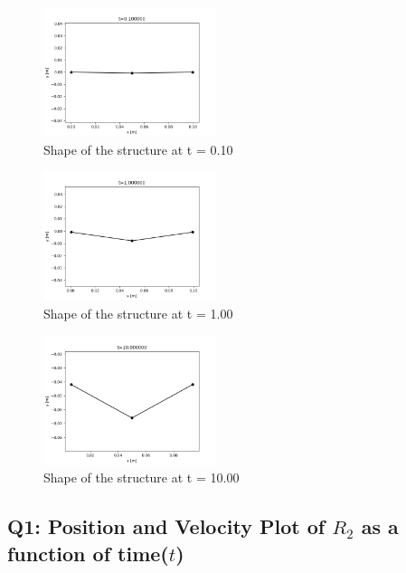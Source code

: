 \documentclass[letterpaper, 10 pt, conference]{ieeeconf}  %
\begin{document}
\begin{figure}[!ht]
        \centering
        \includegraphics[width=0.45\textwidth,keepaspectratio]{p1q1_implicit_0.10.png}
        \caption{Shape of the structure at t = 0.10}
        \label{"fig:p1q1_0.10"}
\end{figure}


\begin{figure}[!ht]
        \centering
        \includegraphics[width=0.45\textwidth,keepaspectratio]{p1q1_implicit_1.00.png}
        \caption{Shape of the structure at t = 1.00}
        \label{"fig:p1q1_1.00"}
\end{figure}


\begin{figure}[!ht]
        \centering
        \includegraphics[width=0.45\textwidth,keepaspectratio]{p1q1_implicit_10.00.png}
        \caption{Shape of the structure at t = 10.00}
        \label{"fig:p1q1_10.00"}
\end{figure}


\subsection*{Q1: Position and Velocity Plot of $R_2$  as a function of time($t$)}
\end{document}

